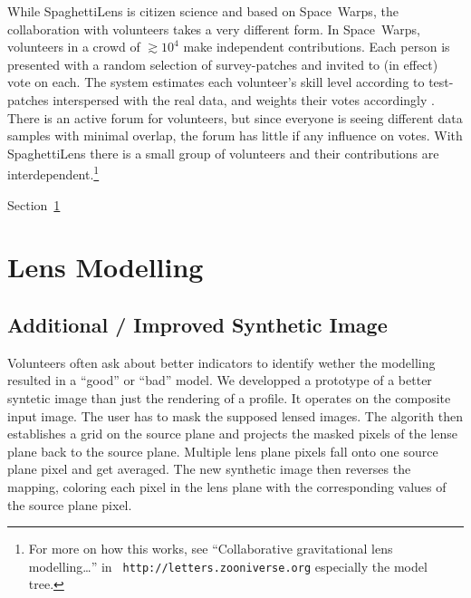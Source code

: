 \documentclass[fleqn,usenatbib]{mnras}
\begin{document}
While SpaghettiLens is citizen science and based on Space~Warps, the
collaboration with volunteers takes a very different form.  In
Space~Warps, volunteers in a crowd of $\gtrsim10^4$ make independent
contributions.  Each person is presented with a random selection of
survey-patches and invited to (in effect) vote on each.  The system
estimates each volunteer's skill level according to test-patches
interspersed with the real data, and weights their votes accordingly
\citep{2016MNRAS.455.1171M}.  There is an active forum for volunteers,
but since everyone is seeing different data samples with minimal
overlap, the forum has little if any influence on votes.  With
SpaghettiLens there is a small group of volunteers and their
contributions are interdependent.\footnote{For more on how this works,
  see ``Collaborative gravitational lens modelling\dots'' in {\tt
    http://letters.zooniverse.org} especially the model tree.}

Section~\ref{sec:spl} 


\section{Lens Modelling}\label{sec:spl}


\subsection{Additional / Improved Synthetic Image}

Volunteers often ask about better indicators to identify wether the modelling resulted in a ``good'' or ``bad'' model.
We developped a prototype of a better syntetic image than just the rendering of a  profile.
It operates on the composite input image.
The user has to mask the supposed lensed images.
The algorith then establishes a grid on the source plane and projects the masked pixels of the lense plane back to the source plane.
Multiple lens plane pixels fall onto one source plane pixel and get averaged.
The new synthetic image then reverses the mapping, coloring each pixel in the lens plane with the corresponding values of the source plane pixel.
\end{document}
